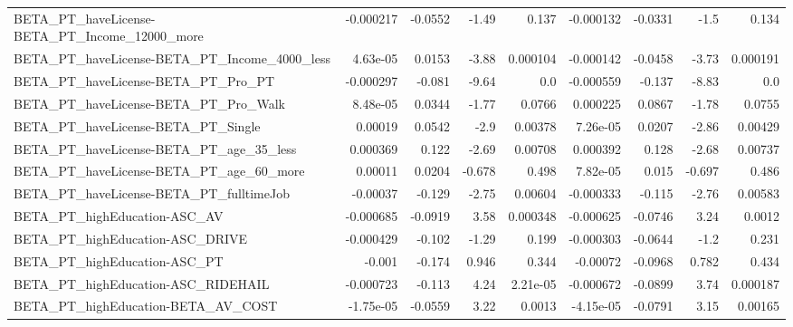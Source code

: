 \begin{tabular}{lrrrrrrrr}
BETA\_PT\_haveLicense-BETA\_PT\_Income\_12000\_more      &   -0.000217 &      -0.0552 &     -1.49 &    0.137 &  -0.000132 &     -0.0331 &         -1.5 &         0.134 \\
BETA\_PT\_haveLicense-BETA\_PT\_Income\_4000\_less       &    4.63e-05 &       0.0153 &     -3.88 & 0.000104 &  -0.000142 &     -0.0458 &        -3.73 &      0.000191 \\
BETA\_PT\_haveLicense-BETA\_PT\_Pro\_PT                 &   -0.000297 &       -0.081 &     -9.64 &      0.0 &  -0.000559 &      -0.137 &        -8.83 &           0.0 \\
BETA\_PT\_haveLicense-BETA\_PT\_Pro\_Walk               &    8.48e-05 &       0.0344 &     -1.77 &   0.0766 &   0.000225 &      0.0867 &        -1.78 &        0.0755 \\
BETA\_PT\_haveLicense-BETA\_PT\_Single                 &     0.00019 &       0.0542 &      -2.9 &  0.00378 &   7.26e-05 &      0.0207 &        -2.86 &       0.00429 \\
BETA\_PT\_haveLicense-BETA\_PT\_age\_35\_less            &    0.000369 &        0.122 &     -2.69 &  0.00708 &   0.000392 &       0.128 &        -2.68 &       0.00737 \\
BETA\_PT\_haveLicense-BETA\_PT\_age\_60\_more            &     0.00011 &       0.0204 &    -0.678 &    0.498 &   7.82e-05 &       0.015 &       -0.697 &         0.486 \\
BETA\_PT\_haveLicense-BETA\_PT\_fulltimeJob            &    -0.00037 &       -0.129 &     -2.75 &  0.00604 &  -0.000333 &      -0.115 &        -2.76 &       0.00583 \\
BETA\_PT\_highEducation-ASC\_AV                       &   -0.000685 &      -0.0919 &      3.58 & 0.000348 &  -0.000625 &     -0.0746 &         3.24 &        0.0012 \\
BETA\_PT\_highEducation-ASC\_DRIVE                    &   -0.000429 &       -0.102 &     -1.29 &    0.199 &  -0.000303 &     -0.0644 &         -1.2 &         0.231 \\
BETA\_PT\_highEducation-ASC\_PT                       &      -0.001 &       -0.174 &     0.946 &    0.344 &   -0.00072 &     -0.0968 &        0.782 &         0.434 \\
BETA\_PT\_highEducation-ASC\_RIDEHAIL                 &   -0.000723 &       -0.113 &      4.24 & 2.21e-05 &  -0.000672 &     -0.0899 &         3.74 &      0.000187 \\
BETA\_PT\_highEducation-BETA\_AV\_COST                 &   -1.75e-05 &      -0.0559 &      3.22 &   0.0013 &  -4.15e-05 &     -0.0791 &         3.15 &       0.00165 \\

\end{tabular}
